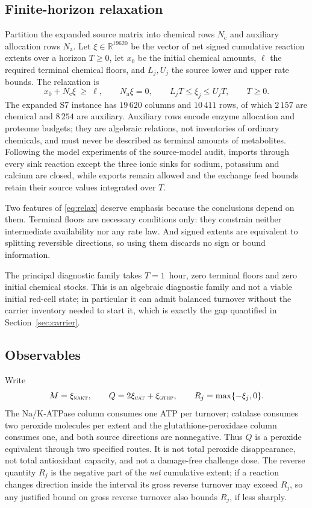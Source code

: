 \documentclass[11pt,a4paper]{article}
\theoremstyle{plain}
\theoremstyle{definition}
\theoremstyle{remark}
\newcommand{\R}{\mathbb R}
\newcommand{\Nc}{N_{\mathrm c}}
\newcommand{\Na}{N_{\mathrm a}}
\newcommand{\rx}[1]{\textnormal{\textsc{#1}}}
\begin{document}
\subsection{Finite-horizon relaxation}
Partition the expanded source matrix into chemical rows $\Nc$ and auxiliary
allocation rows $\Na$. Let $\xi\in\R^{19620}$ be the vector of net signed
cumulative reaction extents over a horizon $T\ge0$, let $x_0$ be the initial
chemical amounts, $\ell$ the required terminal chemical floors, and $L_j,U_j$
the source lower and upper rate bounds. The relaxation is
\begin{equation}\label{eq:relax}
x_0+\Nc\xi\ \ge\ \ell,\qquad \Na\xi=0,\qquad
L_jT\le\xi_j\le U_jT,\qquad T\ge 0 .
\end{equation}
The expanded S7 instance has $19\,620$ columns and $10\,411$ rows, of which
$2\,157$ are chemical and $8\,254$ are auxiliary. Auxiliary rows encode enzyme
allocation and proteome budgets; they are algebraic relations, not inventories
of ordinary chemicals, and must never be described as terminal amounts of
metabolites. Following the model experiments of the source-model audit, imports
through every sink reaction except the three ionic sinks for sodium, potassium
and calcium are closed, while exports remain allowed and the exchange feed
bounds retain their source values integrated over $T$.

Two features of \eqref{eq:relax} deserve emphasis because the conclusions
depend on them. Terminal floors are necessary conditions only: they constrain
neither intermediate availability nor any rate law. And signed extents are
equivalent to splitting reversible directions, so using them discards no sign
or bound information.

The principal diagnostic family takes $T=1$~hour, zero terminal floors and zero
initial chemical stocks. This is an algebraic diagnostic family and not a
viable initial red-cell state; in particular it can admit balanced turnover
without the carrier inventory needed to start it, which is exactly the gap
quantified in Section~\ref{sec:carrier}.

\subsection{Observables}
Write
\begin{equation}\label{eq:obs}
M=\xi_{\rx{nakt}},\qquad Q=2\xi_{\rx{cat}}+\xi_{\rx{gthp}},\qquad
R_j=\max\{-\xi_j,0\}.
\end{equation}
The Na/K-ATPase column consumes one ATP per turnover; catalase consumes two
peroxide molecules per extent and the glutathione-peroxidase column consumes
one, and both source directions are nonnegative. Thus $Q$ is a peroxide
equivalent through two specified routes. It is not total peroxide
disappearance, not total antioxidant capacity, and not a damage-free challenge
dose. The reverse quantity $R_j$ is the negative part of the \emph{net}
cumulative extent; if a reaction changes direction inside the interval its
gross reverse turnover may exceed $R_j$, so any justified bound on gross
reverse turnover also bounds $R_j$, if less sharply.
\end{document}

